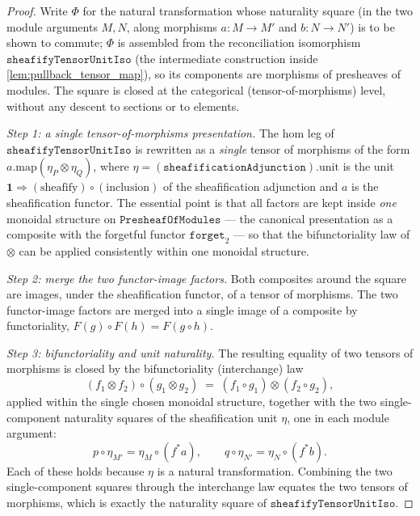 \begin{proof}
  \leanok
  Write \(\Phi\) for the natural transformation whose naturality square (in the two module
  arguments \(M, N\), along morphisms \(a : M \to M'\) and \(b : N \to N'\)) is to be shown
  to commute; \(\Phi\) is assembled from the reconciliation isomorphism
  \(\mathtt{sheafifyTensorUnitIso}\) (the intermediate construction inside
  \cref{lem:pullback_tensor_map}), so its components are morphisms of presheaves of modules.
  The square is closed at the categorical (tensor-of-morphisms) level, without any descent to
  sections or to elements.

  \emph{Step 1: a single tensor-of-morphisms presentation.} The \(\mathrm{hom}\) leg of
  \(\mathtt{sheafifyTensorUnitIso}\) is rewritten as a \emph{single} tensor of morphisms of the
  form \(a.\mathrm{map}(\eta_P \otimes \eta_Q)\), where
  \(\eta = (\mathtt{sheafificationAdjunction}).\mathrm{unit}\) is the unit
  \(\mathbf{1} \Rightarrow (\text{sheafify}) \circ (\text{inclusion})\) of the sheafification
  adjunction and \(a\) is the sheafification functor. The essential point is that all factors
  are kept inside \emph{one} monoidal structure on \(\mathtt{PresheafOfModules}\) --- the
  canonical presentation as a composite with the forgetful functor \(\mathtt{forget}_2\) ---
  so that the bifunctoriality law of \(\otimes\) can be applied consistently within one
  monoidal structure.

  \emph{Step 2: merge the two functor-image factors.} Both composites around the square are
  images, under the sheafification functor, of a tensor of morphisms. The two functor-image
  factors are merged into a single image of a composite by functoriality,
  \(F(g) \circ F(h) = F(g \circ h)\).

  \emph{Step 3: bifunctoriality and unit naturality.} The resulting equality of two tensors of
  morphisms is closed by the bifunctoriality (interchange) law
  \[
    (f_1 \otimes f_2) \circ (g_1 \otimes g_2) \;=\; (f_1 \circ g_1) \otimes (f_2 \circ g_2),
  \]
  applied within the single chosen monoidal structure, together with the two
  single-component naturality squares of the sheafification unit \(\eta\), one in each module
  argument:
  \[
    p \circ \eta_{M'} = \eta_{M} \circ (f^*a),
    \qquad
    q \circ \eta_{N'} = \eta_{N} \circ (f^*b).
  \]
  Each of these holds because \(\eta\) is a natural transformation. Combining the two
  single-component squares through the interchange law equates the two tensors of morphisms,
  which is exactly the naturality square of \(\mathtt{sheafifyTensorUnitIso}\).
\end{proof}

